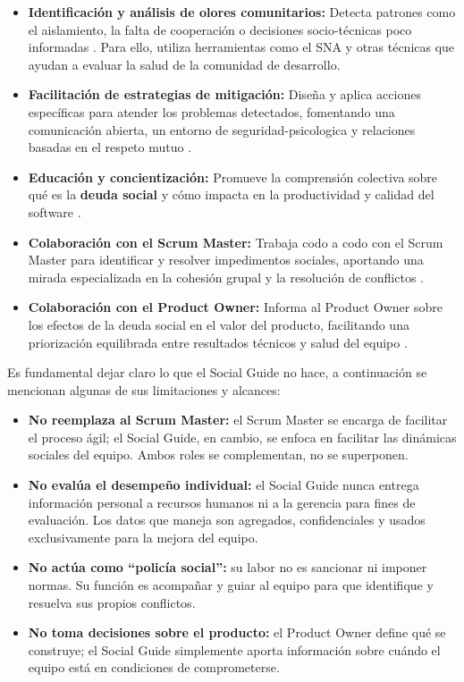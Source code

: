 \begin{itemize}
    \item \textbf{Identificación y análisis de olores comunitarios:} Detecta patrones como el aislamiento, la falta de cooperación o decisiones socio-técnicas poco informadas \cite{saeeda2024nontechnicaldebt}. Para ello, utiliza herramientas como el SNA y otras técnicas que ayudan a evaluar la salud de la comunidad de desarrollo.

    \item \textbf{Facilitación de estrategias de mitigación:} Diseña y aplica acciones específicas para atender los problemas detectados, fomentando una comunicación abierta, un entorno de \gls{seguridad-psicologica} y relaciones basadas en el respeto mutuo \cite{saeeda2024nontechnicaldebt, martini2019agiledebt}.

    \item \textbf{Educación y concientización:} Promueve la comprensión colectiva sobre qué es la \textbf{deuda social} y cómo impacta en la productividad y calidad del software \cite{tamburri2015insights}.

    \item \textbf{Colaboración con el Scrum Master:} Trabaja codo a codo con el Scrum Master para identificar y resolver impedimentos sociales, aportando una mirada especializada en la cohesión grupal y la resolución de conflictos \cite{schwaber2020scrum}.

    \item \textbf{Colaboración con el Product Owner:} Informa al Product Owner sobre los efectos de la deuda social en el valor del producto, facilitando una priorización equilibrada entre resultados técnicos y salud del equipo \cite{saeeda2024nontechnicaldebt, tulili2022burnout}.
\end{itemize}

Es fundamental dejar claro lo que el Social Guide no hace, a continuación se mencionan algunas de sus limitaciones y alcances:

\begin{itemize}
    \item \textbf{No reemplaza al Scrum Master:} el Scrum Master se encarga de facilitar el proceso ágil; el Social Guide, en cambio, se enfoca en facilitar las dinámicas sociales del equipo. Ambos roles se complementan, no se superponen.
    \item \textbf{No evalúa el desempeño individual:} el Social Guide nunca entrega información personal a recursos humanos ni a la gerencia para fines de evaluación. Los datos que maneja son agregados, confidenciales y usados exclusivamente para la mejora del equipo.
    \item \textbf{No actúa como ``policía social'':} su labor no es sancionar ni imponer normas. Su función es acompañar y guiar al equipo para que identifique y resuelva sus propios conflictos.
    \item \textbf{No toma decisiones sobre el producto:} el Product Owner define qué se construye; el Social Guide simplemente aporta información sobre cuándo el equipo está en condiciones de comprometerse.
\end{itemize}

